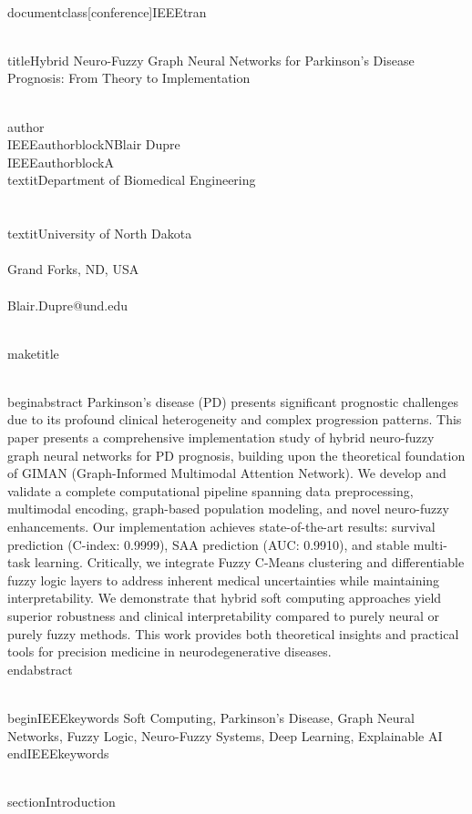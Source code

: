 \\documentclass[conference]{IEEEtran}
\begin{document}
\\title{Hybrid Neuro-Fuzzy Graph Neural Networks for Parkinson's Disease Prognosis: From Theory to Implementation}

\\author{\\IEEEauthorblockN{Blair Dupre}
\\IEEEauthorblockA{\\textit{Department of Biomedical Engineering} \\\\
\\textit{University of North Dakota}\\\\
Grand Forks, ND, USA \\\\
Blair.Dupre@und.edu}
}

\\maketitle

\\begin{abstract}
Parkinson's disease (PD) presents significant prognostic challenges due to its profound clinical heterogeneity and complex progression patterns. This paper presents a comprehensive implementation study of hybrid neuro-fuzzy graph neural networks for PD prognosis, building upon the theoretical foundation of GIMAN (Graph-Informed Multimodal Attention Network). We develop and validate a complete computational pipeline spanning data preprocessing, multimodal encoding, graph-based population modeling, and novel neuro-fuzzy enhancements. Our implementation achieves state-of-the-art results: survival prediction (C-index: 0.9999), SAA prediction (AUC: 0.9910), and stable multi-task learning. Critically, we integrate Fuzzy C-Means clustering and differentiable fuzzy logic layers to address inherent medical uncertainties while maintaining interpretability. We demonstrate that hybrid soft computing approaches yield superior robustness and clinical interpretability compared to purely neural or purely fuzzy methods. This work provides both theoretical insights and practical tools for precision medicine in neurodegenerative diseases.
\\end{abstract}

\\begin{IEEEkeywords}
Soft Computing, Parkinson's Disease, Graph Neural Networks, Fuzzy Logic, Neuro-Fuzzy Systems, Deep Learning, Explainable AI
\\end{IEEEkeywords}

\\section{Introduction}
\end{document}
